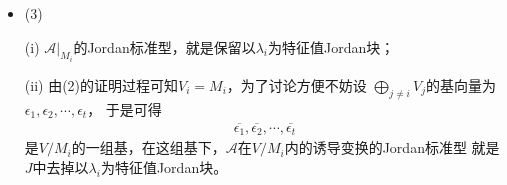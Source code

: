 \documentclass{article}
\begin{document}
\begin{itemize}
        因为$\alpha \in M_i$，存在$m$使得
        \begin{align*}
          (\mathscr{A} - \lambda_i \mathscr{E})^m \alpha = 0
        \end{align*}
        即
        \begin{align*}
          (\mathscr{A} - \lambda_i \mathscr{E})^m (\alpha_i + \sum\limits_{j \neq i} \alpha_j) & = 0 \\
          (\mathscr{A} - \lambda_i \mathscr{E})^m \alpha_i
          + \sum\limits_{j \neq i} (\mathscr{A} - \lambda_i \mathscr{E})^m \alpha_j            & = 0
        \end{align*}
        因为$V_i, V_j (j \neq i)$都是不变子空间，所以
        \begin{align*}
          (\mathscr{A} - \lambda_i \mathscr{E})^m \alpha_i \in V_i \\
          (\mathscr{A} - \lambda_i \mathscr{E})^m \alpha_j \in V_j, j \neq i
        \end{align*}
        由直和0向量表示的唯一性可知
        \begin{align*}
          (\mathscr{A} - \lambda_i \mathscr{E})^m \alpha_i = 0 \\
          (\mathscr{A} - \lambda_i \mathscr{E})^m \alpha_j = 0, j \neq i
        \end{align*}
        又因为，在$V_j$上，$\mathscr{A} - \lambda_i \mathscr{E}$
        的矩阵为$J_j - \lambda_i E$是满秩的，故$\alpha_j = 0$，
        所以
        \begin{align*}
          \alpha = \alpha_i \in V_i
        \end{align*}
        于是可得 $M_i \subseteq V_i$.

        综上可得，$V_i = M_i$.
  \item (3)

        (i) $\mathscr{A}\big|_{M_i}$的Jordan标准型，就是保留以$\lambda_i$为特征值Jordan块；

        (ii) 由(2)的证明过程可知$V_i = M_i$，为了讨论方便不妨设
        $\bigoplus \limits_{j \neq i} V_j$的基向量为
        $\epsilon_1, \epsilon_2, \cdots, \epsilon_t$，
        于是可得
        \begin{align*}
          \overline{\epsilon_1}, \overline{\epsilon_2}, \cdots, \overline{\epsilon_t}
        \end{align*}
        是$V/M_i$的一组基，在这组基下，$\mathscr{A}$在$V/M_i$内的诱导变换的Jordan标准型
        就是$J$中去掉以$\lambda_i$为特征值Jordan块。
\end{itemize}
\end{document}
